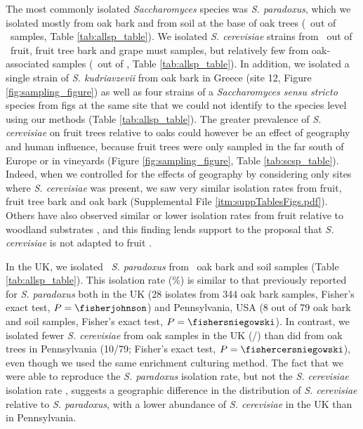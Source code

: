 \documentclass[12pt]{article}
\begin{document}
\begin{linenumbers}
The most commonly isolated \textit{Saccharomyces} species was \textit{S. paradoxus}, which we isolated mostly from oak bark and from soil at the base of oak trees (\sparoak\ out of \oak\ samples, Table \ref{tab:allsp_table}). We isolated \textit{S. cerevisiae} strains from \scerfruit\ out of \fruit\ fruit, fruit tree bark and grape must samples, but relatively few from oak-associated samples (\sceroak\ out of \oak, Table \ref{tab:allsp_table}). In addition, we isolated a single strain of \textit{S. kudriavzevii} from oak bark in Greece (site 12, Figure \ref{fig:sampling_figure}) as well as four strains of a \textit{Saccharomyces sensu stricto} species from figs at the same site that we could not identify to the species level using our methods (Table \ref{tab:allsp_table}). The greater prevalence of \textit{S. cerevisiae} on fruit trees relative to oaks could however be an effect of geography and human influence, because fruit trees were only sampled in the far south of Europe or in vineyards (Figure \ref{fig:sampling_figure}, Table \ref{tab:scsp_table}). Indeed, when we controlled for the effects of geography by considering only sites where \textit{S. cerevisiae} was present, we saw very similar isolation rates from fruit, fruit tree bark and oak bark (Supplemental File \ref{itm:suppTablesFigs.pdf}). Others have also observed similar or lower isolation rates from fruit relative to woodland substrates \citep{wang_surprisingly_2012}, and this finding lends support to the proposal that \textit{S. cerevisiae} is not adapted to fruit \citep{goddard_saccharomyces_2015}.

In the UK, we isolated \sparnorthoak\ \textit{S. paradoxus} from \northoaksamples\ oak bark and soil samples (Table \ref{tab:allsp_table}). This isolation rate (\sparnorthoakrate\%) is similar to that previously reported for \textit{S. paradoxus} both in the UK \citep{johnson_population_2004} (28 isolates from 344 oak bark samples, Fisher's exact test, $P=\fisherjohnson$) and Pennsylvania, USA \citep{sniegowski_saccharomyces_2002} (8 out of 79 oak bark and soil samples, Fisher's exact test, $P=\fishersniegowski$). In contrast, we isolated fewer \textit{S. cerevisiae} from oak samples in the UK (\scernorthoak/\northoaksamples) than \citet{sniegowski_saccharomyces_2002} did from oak trees in Pennsylvania (10/79; Fisher's exact test, $P=\fishercersniegowski$), even though we used the same enrichment culturing method. The fact that we were able to reproduce the \textit{S. paradoxus} isolation rate, but not the \textit{S. cerevisiae} isolation rate \citep{sniegowski_saccharomyces_2002}, suggests a geographic difference in the distribution of \textit{S. cerevisiae} relative to \textit{S. paradoxus}, with a lower abundance of \textit{S. cerevisiae} in the UK than in Pennsylvania. 


\end{linenumbers}
\end{document}

